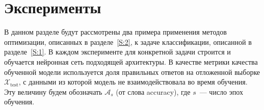 \documentclass[preprint,12pt]{elsarticle}
\begin{document}
{%



\section{Эксперименты}
\label{S:3}
В данном разделе будут рассмотрены два примера применения методов оптимизации, описанных в разделе~\ref{S:2}, к задаче классификации, описанной в разделе~\ref{S:1}. В каждом эксперименте для конкретной задачи строится и обучается нейронная сеть подходящей архитектуры. В качестве метрики качества обученной модели используется доля правильных ответов на отложенной выборке $\mathcal{X}_\text{test}$, с данными из которой модель не взаимодействовала во время обучения. Эту величину будем обозначать $\mathcal{A}_s$ (от слова accuracy), где $s$~--- число эпох обучения.
}
\end{document}
